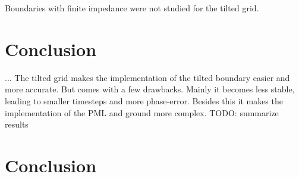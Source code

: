 \documentclass{article}
\begin{document}
Boundaries with finite impedance were not studied for the tilted grid. 


\section{Conclusion}

...
The tilted grid makes the implementation of the tilted boundary easier and more accurate. 
But comes with a few drawbacks.
Mainly it becomes less stable, 
leading to smaller timesteps and more phase-error. 
Besides this it makes the implementation of the PML and ground more complex.
TODO: summarize results


\section{Conclusion}
\end{document}
